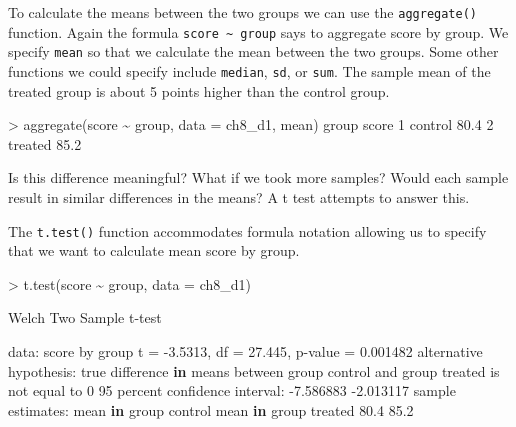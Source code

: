 \documentclass[
]{book}
\newenvironment{Shaded}{\begin{snugshade}}{\end{snugshade}}
\newcommand{\AttributeTok}[1]{\textcolor[rgb]{0.77,0.63,0.00}{#1}}
\newcommand{\ControlFlowTok}[1]{\textcolor[rgb]{0.13,0.29,0.53}{\textbf{#1}}}
\newcommand{\DecValTok}[1]{\textcolor[rgb]{0.00,0.00,0.81}{#1}}
\newcommand{\FloatTok}[1]{\textcolor[rgb]{0.00,0.00,0.81}{#1}}
\newcommand{\FunctionTok}[1]{\textcolor[rgb]{0.00,0.00,0.00}{#1}}
\newcommand{\NormalTok}[1]{#1}
\newcommand{\OtherTok}[1]{\textcolor[rgb]{0.56,0.35,0.01}{#1}}
\newcommand{\SpecialCharTok}[1]{\textcolor[rgb]{0.00,0.00,0.00}{#1}}
\begin{document}
To calculate the means between the two groups we can use the \texttt{aggregate()} function. Again the formula \texttt{score\ \textasciitilde{}\ group} says to aggregate score by group. We specify \texttt{mean} so that we calculate the mean between the two groups. Some other functions we could specify include \texttt{median}, \texttt{sd}, or \texttt{sum}. The sample mean of the treated group is about 5 points higher than the control group.

\begin{Shaded}
\begin{Highlighting}[]
\SpecialCharTok{\textgreater{}} \FunctionTok{aggregate}\NormalTok{(score }\SpecialCharTok{\textasciitilde{}}\NormalTok{ group, }\AttributeTok{data =}\NormalTok{ ch8\_d1, mean)}
\NormalTok{    group score}
\DecValTok{1}\NormalTok{ control  }\FloatTok{80.4}
\DecValTok{2}\NormalTok{ treated  }\FloatTok{85.2}
\end{Highlighting}
\end{Shaded}

Is this difference meaningful? What if we took more samples? Would each sample result in similar differences in the means? A t test attempts to answer this.

The \texttt{t.test()} function accommodates formula notation allowing us to specify that we want to calculate mean score by group.

\begin{Shaded}
\begin{Highlighting}[]
\SpecialCharTok{\textgreater{}} \FunctionTok{t.test}\NormalTok{(score }\SpecialCharTok{\textasciitilde{}}\NormalTok{ group, }\AttributeTok{data =}\NormalTok{ ch8\_d1)}

\NormalTok{    Welch Two Sample t}\SpecialCharTok{{-}}\NormalTok{test}

\NormalTok{data}\SpecialCharTok{:}\NormalTok{  score by group}
\NormalTok{t }\OtherTok{=} \SpecialCharTok{{-}}\FloatTok{3.5313}\NormalTok{, df }\OtherTok{=} \FloatTok{27.445}\NormalTok{, p}\SpecialCharTok{{-}}\NormalTok{value }\OtherTok{=} \FloatTok{0.001482}
\NormalTok{alternative hypothesis}\SpecialCharTok{:}\NormalTok{ true difference }\ControlFlowTok{in}\NormalTok{ means between group control and group treated is not equal to }\DecValTok{0}
\DecValTok{95}\NormalTok{ percent confidence interval}\SpecialCharTok{:}
 \SpecialCharTok{{-}}\FloatTok{7.586883} \SpecialCharTok{{-}}\FloatTok{2.013117}
\NormalTok{sample estimates}\SpecialCharTok{:}
\NormalTok{mean }\ControlFlowTok{in}\NormalTok{ group control mean }\ControlFlowTok{in}\NormalTok{ group treated }
                 \FloatTok{80.4}                  \FloatTok{85.2} 
\end{Highlighting}
\end{Shaded}
\end{document}

